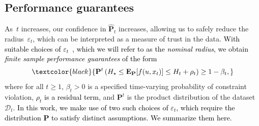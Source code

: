 \documentclass[12pt]{article}
\newcommand{\prob}{{\mathbf P}}
\newcommand{\Expect}{{\mbox{\bf E}}}
\newcommand{\epsnom}{\varepsilon}
\newcommand{\RC}[1]{\textcolor{black}{#1}}
\newcommand{\RC}[1]{\textcolor{blue}{#1}}
\begin{document}
\subsection{Performance guarantees}
\label{subsec:nom_perf}
As~$t$ increases, our confidence in $\hat{\prob}_t$ increases, allowing us to safely reduce the radius~$\epsnom_t$, which can be interpreted as a measure of trust in the data.
\RC{With suitable choices of $\epsnom_t$~\cite{fournier2015rate,mohajerin2018data,gao2016distributionally}, which we will refer to as the {\it nominal radius}, we obtain
{\it finite sample performance guarantees} of the form}
\begin{equation}
	\label{eq:prob_guarantees1}
	\RC{\prob^{t}\left( H_\star \leq \Expect_{\prob}[f(u, x_t)] \le H_t + \rho_{t}\right) \ge 1 - \beta_{t},}
\end{equation}
where for all $t\geq 1$, $\beta_{t} > 0$ is a specified time-varying
probability of constraint violation, \RC{$\rho_{t}$ is a residual term}, and $\prob^{t}$ is the product distribution of the dataset $\mathcal{D}_{t}$. 
\RC{In this work, we make use of two such choices of $\epsnom_t$, which require the distribution $\prob$ to satisfy distinct assumptions. We summarize them here.}
\end{document}

